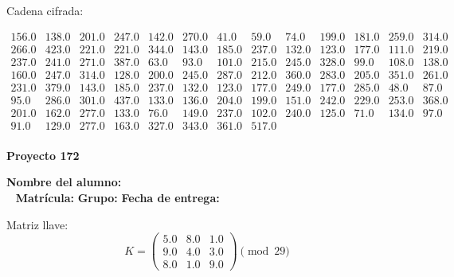 \documentclass[12pt]{article}
\begin{document}
Cadena cifrada:
\begin{center}
$\begin{array}{lllllllllllll}
156.0 & 138.0 & 201.0 & 247.0 & 142.0 & 270.0 & 41.0 & 59.0 & 74.0 & 199.0 & 181.0 & 259.0 & 314.0\\
266.0 & 423.0 & 221.0 & 221.0 & 344.0 & 143.0 & 185.0 & 237.0 & 132.0 & 123.0 & 177.0 & 111.0 & 219.0\\
237.0 & 241.0 & 271.0 & 387.0 & 63.0 & 93.0 & 101.0 & 215.0 & 245.0 & 328.0 & 99.0 & 108.0 & 138.0\\
160.0 & 247.0 & 314.0 & 128.0 & 200.0 & 245.0 & 287.0 & 212.0 & 360.0 & 283.0 & 205.0 & 351.0 & 261.0\\
231.0 & 379.0 & 143.0 & 185.0 & 237.0 & 132.0 & 123.0 & 177.0 & 249.0 & 177.0 & 285.0 & 48.0 & 87.0\\
95.0 & 286.0 & 301.0 & 437.0 & 133.0 & 136.0 & 204.0 & 199.0 & 151.0 & 242.0 & 229.0 & 253.0 & 368.0\\
201.0 & 162.0 & 277.0 & 133.0 & 76.0 & 149.0 & 237.0 & 102.0 & 240.0 & 125.0 & 71.0 & 134.0 & 97.0\\
91.0 & 129.0 & 277.0 & 163.0 & 327.0 & 343.0 & 361.0 & 517.0\\
\end{array}$
\end{center}

\newpage


\textbf{Proyecto 172}

\textbf{Nombre del alumno:} \underline{\hspace{13cm}}\\\
\vspace{1cm}
\textbf{Matrícula:} \underline{\hspace{4cm}} \hspace{1cm}
\textbf{Grupo:} \underline{\hspace{2cm}}
\textbf{Fecha de entrega:} \underline{\hspace{2cm}}

\medskip

Matriz llave:
\[
K = \begin{pmatrix}
5.0 & 8.0 & 1.0\\
9.0 & 4.0 & 3.0\\
8.0 & 1.0 & 9.0
\end{pmatrix} \pmod{29}
\]
\end{document}
